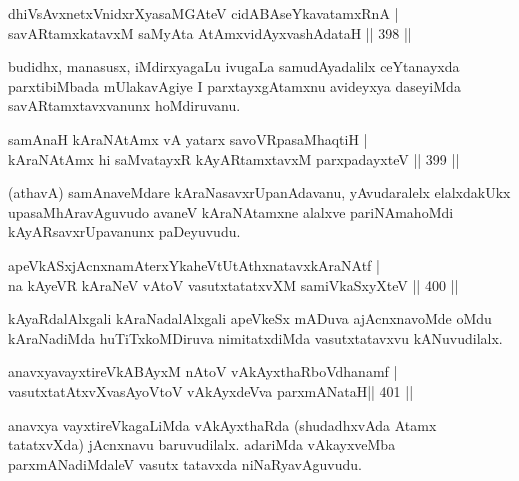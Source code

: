 \begin{shl}
dhiVsAvxnetxVnidxrXyasaMGAteV cidABAseYkavatamxRnA | \\
savARtamxkatavxM saMyAta AtAmx\s vidAyxvashAdataH \hfill||  398 ||  
\end{shl}

\begin{artha}
budidhx, manasusx, iMdirxyagaLu ivugaLa samudAyadalilx ceYtanayxda parxtibiMbada mUlakavAgiye I parxtayxgAtamxnu avideyxya daseyiMda savARtamxtavxvanunx hoMdiruvanu.
\end{artha}

\begin{shl}
samAnaH kAraNAtAmx vA yatarx savoVRpasaMhaqtiH | \\
kAraNAtAmx hi saMvatayxR kAyARtamxtavxM parxpadayxteV \hfill||  399 || 
\end{shl}

\begin{artha}
(athavA) samAnaveMdare kAraNasavxrUpanAdavanu, yAvudaralelx elalxdakUkx upasaMhAravAguvudo avaneV kAraNAtamxne alalxve pariNAmahoMdi kAyARsavxrUpavanunx paDeyuvudu.
\end{artha}


\begin{shl}
apeVkASxjAcnxnamAterxYkaheVtUtAthxnatavxkAraNAtf | \\
na kAyeVR kAraNeV vA\s toV vasutxtatatxvXM samiVkaSxyXteV \hfill||  400 ||  
\end{shl}

\begin{artha}
kAyaRdalAlxgali kAraNadalAlxgali apeVkeSx mADuva ajAcnxnavoMde oMdu kAraNadiMda huTiTxkoMDiruva nimitatxdiMda vasutxtatavxvu kANuvudilalx.
\end{artha}


\begin{shl}
anavxyavayxtireVkABAyxM nAtoV vAkAyxthaRboVdhanamf | \\
vasutxtatAtxvXvasAyoV\s toV vAkAyxdeVva parxmANataH\hfill ||  401 ||  
\end{shl}

\begin{artha}
anavxya vayxtireVkagaLiMda vAkAyxthaRda (shudadhxvAda Atamx tatatxvXda) jAcnxnavu baruvudilalx. adariMda vAkayxveMba parxmANadiMdaleV vasutx tatavxda niNaRyavAguvudu.
\end{artha}

